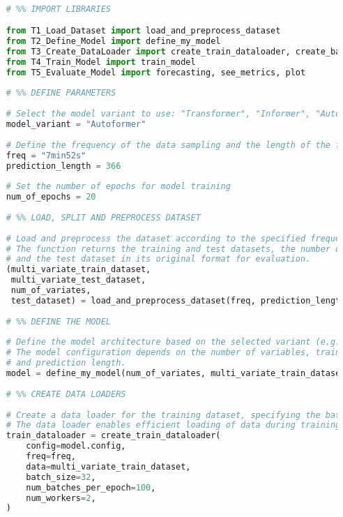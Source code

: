 \begin{lstlisting}[language=Python, caption={Code for entry point and orchestration of the time series forecasting pipeline}, breaklines=true, label=code1]

    # %% IMPORT LIBRARIES

    from T1_Load_Dataset import load_and_preprocess_dataset
    from T2_Define_Model import define_my_model
    from T3_Create_DataLoader import create_train_dataloader, create_backtest_dataloader
    from T4_Train_Model import train_model
    from T5_Evaluate_Model import forecasting, see_metrics, plot
    
    # %% DEFINE PARAMETERS
    
    # Select the model variant to use: "Transformer", "Informer", "Autoformer"
    model_variant = "Autoformer"
    
    # Define the frequency of the data sampling and the length of the forecast horizon
    freq = "7min52s"
    prediction_length = 366
    
    # Set the number of epochs for model training
    num_of_epochs = 20
    
    # %% LOAD, SPLIT AND PREPROCESS DATASET
    
    # Load and preprocess the dataset according to the specified frequency and prediction length.
    # The function returns the training and test datasets, the number of variables in the dataset,
    # and the test dataset in its original format for evaluation.
    (multi_variate_train_dataset,
     multi_variate_test_dataset,
     num_of_variates,
     test_dataset) = load_and_preprocess_dataset(freq, prediction_length)
    
    # %% DEFINE THE MODEL
    
    # Define the model architecture based on the selected variant (e.g., Autoformer).
    # The model configuration depends on the number of variables, training data, frequency,
    # and prediction length.
    model = define_my_model(num_of_variates, multi_variate_train_dataset, model_variant, freq, prediction_length)
    
    # %% CREATE DATA LOADERS
    
    # Create a data loader for the training dataset, specifying the batch size and number of batches per epoch.
    # The data loader enables efficient loading of data during training.
    train_dataloader = create_train_dataloader(
        config=model.config,
        freq=freq,
        data=multi_variate_train_dataset,
        batch_size=32,
        num_batches_per_epoch=100,
        num_workers=2,
    )
    

\end{lstlisting}
